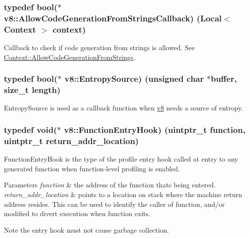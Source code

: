 \subsubsection[{\texorpdfstring{Allow\+Code\+Generation\+From\+Strings\+Callback}{AllowCodeGenerationFromStringsCallback}}]{\setlength{\rightskip}{0pt plus 5cm}typedef bool($\ast$ v8\+::\+Allow\+Code\+Generation\+From\+Strings\+Callback) ({\bf Local}$<$ {\bf Context} $>$ context)}\hypertarget{namespacev8_a521d909ec201742a1cb35d50a8e2a3c2}{}\label{namespacev8_a521d909ec201742a1cb35d50a8e2a3c2}
Callback to check if code generation from strings is allowed. See \hyperlink{classv8_1_1_context_a794ccc42113566f5d363f89c8b0d3c2c}{Context\+::\+Allow\+Code\+Generation\+From\+Strings}. 
\subsubsection[{\texorpdfstring{Entropy\+Source}{EntropySource}}]{\setlength{\rightskip}{0pt plus 5cm}typedef bool($\ast$ v8\+::\+Entropy\+Source) (unsigned char $\ast$buffer, size\+\_\+t length)}\hypertarget{namespacev8_ab699f4bbbb56350e6e915682e420fcdc}{}\label{namespacev8_ab699f4bbbb56350e6e915682e420fcdc}
Entropy\+Source is used as a callback function when \hyperlink{namespacev8}{v8} needs a source of entropy. 
\subsubsection[{\texorpdfstring{Function\+Entry\+Hook}{FunctionEntryHook}}]{\setlength{\rightskip}{0pt plus 5cm}typedef void($\ast$ v8\+::\+Function\+Entry\+Hook) (uintptr\+\_\+t function, uintptr\+\_\+t return\+\_\+addr\+\_\+location)}\hypertarget{namespacev8_aaf07fb6bb13f295da3c6568938b7dec5}{}\label{namespacev8_aaf07fb6bb13f295da3c6568938b7dec5}
Function\+Entry\+Hook is the type of the profile entry hook called at entry to any generated function when function-\/level profiling is enabled.


\begin{DoxyParams}{Parameters}
{\em function} & the address of the function that\textquotesingle{}s being entered. \\
\hline
{\em return\+\_\+addr\+\_\+location} & points to a location on stack where the machine return address resides. This can be used to identify the caller of {\ttfamily function}, and/or modified to divert execution when {\ttfamily function} exits.\\
\hline
\end{DoxyParams}
\begin{DoxyNote}{Note}
the entry hook must not cause garbage collection. 
\end{DoxyNote}
